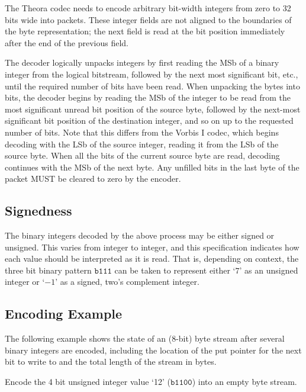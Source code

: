 \documentclass[9pt,letterpaper]{book}
\newcommand{\bin}[1]{\ensuremath{\mathtt{b#1}}}
\numberwithin{equation}{chapter}
\numberwithin{figure}{chapter}
\numberwithin{table}{chapter}
\begin{document}
The Theora codec needs to encode arbitrary bit-width integers from zero to 32
 bits wide into packets.
These integer fields are not aligned to the boundaries of the byte
 representation; the next field is read at the bit position immediately
 after the end of the previous field.

The decoder logically unpacks integers by first reading the MSb of a binary
 integer from the logical bitstream, followed by the next most significant
 bit, etc., until the required number of bits have been read.
When unpacking the bytes into bits, the decoder begins by reading the MSb of
 the integer to be read from the most significant unread bit position of the
 source byte, followed by the next-most significant bit position of the
 destination integer, and so on up to the requested number of bits.
Note that this differs from the Vorbis I codec, which
 begins decoding with the LSb of the source integer, reading it from the
 LSb of the source byte.
When all the bits of the current source byte are read, decoding continues with
 the MSb of the next byte.
Any unfilled bits in the last byte of the packet MUST be cleared to zero by the
 encoder.

\subsection{Signedness}

The binary integers decoded by the above process may be either signed or
 unsigned.
This varies from integer to integer, and this specification
 indicates how each value should be interpreted as it is read.
That is, depending on context, the three bit binary pattern \bin{111} can be
 taken to represent either `$7$' as an unsigned integer or `$-1$' as a signed,
 two's complement integer.

\subsection{Encoding Example}

The following example shows the state of an (8-bit) byte stream after several
 binary integers are encoded, including the location of the put pointer for the
 next bit to write to and the total length of the stream in bytes.

Encode the 4 bit unsigned integer value `12' (\bin{1100}) into an empty byte
 stream.
\end{document}
